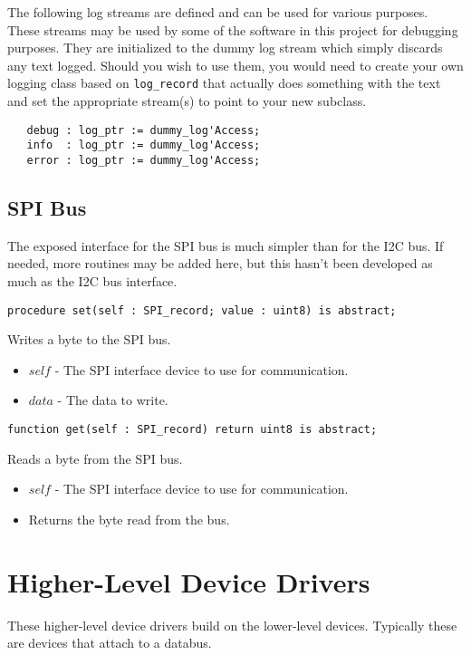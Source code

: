 \documentclass[10pt, openany]{book}
\newcommand{\package}[1]{\texttt{#1}}
\begin{document}
The following log streams are defined and can be used for various purposes.  These streams may be used by some of the software in this project for debugging purposes.  They are initialized to the dummy log stream which simply discards any text logged.  Should you wish to use them, you would need to create your own logging class based on \package{log\_record} that actually does something with the text and set the appropriate stream(s) to point to your new subclass.
\begin{lstlisting}
   debug : log_ptr := dummy_log'Access;
   info  : log_ptr := dummy_log'Access;
   error : log_ptr := dummy_log'Access;
\end{lstlisting}

\subsection{SPI Bus}
The exposed interface for the SPI bus is much simpler than for the I2C bus.  If needed, more routines may be added here, but this hasn't been developed as much as the I2C bus interface.
\begin{lstlisting}
procedure set(self : SPI_record; value : uint8) is abstract;
\end{lstlisting}
Writes a byte to the SPI bus.
\begin{itemize}
  \item $self$ - The SPI interface device to use for communication.
  \item $data$ - The data to write.
\end{itemize}
\begin{lstlisting}
function get(self : SPI_record) return uint8 is abstract;
\end{lstlisting}
Reads a byte from the SPI bus.
\begin{itemize}
  \item $self$ - The SPI interface device to use for communication.
  \item Returns the byte read from the bus.
\end{itemize}

\section{Higher-Level Device Drivers}
These higher-level device drivers build on the lower-level devices.  Typically these are devices that attach to a databus.
\end{document}
